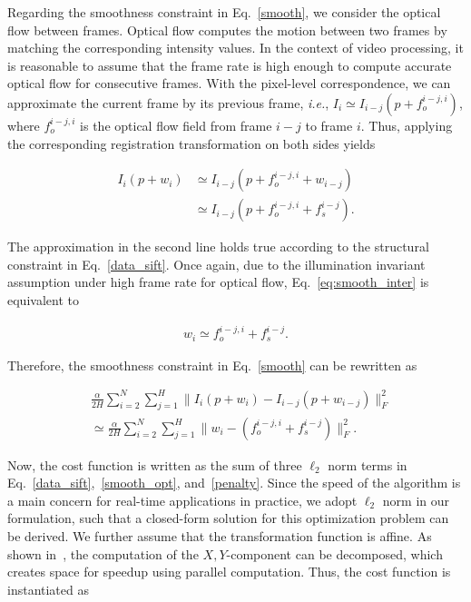 \documentclass[10pt,journal]{IEEEtran}
\begin{document}
Regarding the smoothness constraint in Eq.~\eqref{smooth}, we consider the optical flow between frames. Optical flow computes the motion between two frames by matching the corresponding intensity values. In the context of video processing, it is reasonable to assume that the frame rate is high enough to compute accurate optical flow for consecutive frames. With the pixel-level correspondence, we can approximate the current frame by its previous frame, \textit{i.e.}, $I_i\simeq I_{i-j}(p+f_o^{i-j,i})$, where $f_o^{i-j,i}$ is the optical flow field from frame $i-j$ to frame $i$. Thus, applying the corresponding registration transformation on both sides yields

\begin{equation}
\begin{aligned}
\label{eq:smooth_inter}
I_i(p+w_i)& \simeq I_{i-j}(p+f_o^{i-j,i}+w_{i-j}) \\
					& \simeq I_{i-j}(p+f_o^{i-j,i}+f_s^{i-j}).
\end{aligned}
\end{equation}

The approximation in the second line holds true according to the structural constraint in Eq.~\eqref{data_sift}. Once again, due to the illumination invariant assumption under high frame rate for optical flow, Eq.~\eqref{eq:smooth_inter} is equivalent to

\begin{equation}
\begin{aligned}
w_i \simeq f_o^{i-j,i}+f_s^{i-j}.
\end{aligned}
\end{equation}

Therefore, the smoothness constraint in Eq.~\eqref{smooth} can be rewritten as

\begin{equation}
\begin{aligned}
\label{smooth_opt}
&\frac{\alpha}{2H}\sum_{i=2}^{N}\sum_{j=1}^{H}\parallel{I_i(p+w_i)-I_{i-j}(p+w_{i-j})}\parallel_F^2 \\
&\simeq\frac{\alpha}{2H}\sum_{i=2}^{N}\sum_{j=1}^{H}\parallel{w_i-(f_o^{i-j,i}+f_s^{i-j})}\parallel_F^2.
\end{aligned}
\end{equation}


Now, the cost function is written as the sum of three $\ell_2$ norm terms in Eq.~\eqref{data_sift},~\eqref{smooth_opt}, and~\eqref{penalty}. Since the speed of the algorithm is a main concern for real-time applications in practice, we adopt $\ell_2$ norm in our formulation, such that a closed-form solution for this optimization problem can be derived. We further assume that the transformation function is affine. As shown in~\cite{Yang_FG13}, the computation of the $X,Y$-component can be decomposed, which creates space for speedup using parallel computation. Thus, the cost function is instantiated as
\end{document}
